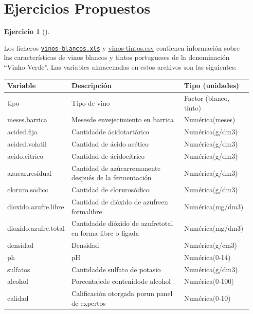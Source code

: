 \documentclass[
  a4paper,
]{scrreport}
\theoremstyle{definition}
\newtheorem{exercise}{Ejercicio}[chapter]
\theoremstyle{remark}
\begin{document}
\section{Ejercicios Propuestos}\label{ejercicios-propuestos-1}

\begin{exercise}[]\protect\hypertarget{exr-preprocesaimento-5}{}\label{exr-preprocesaimento-5}

Los ficheros \href{datos/vinos-blancos.xls}{\texttt{vinos-blancos.xls}}
y \href{datos/vinos-tintos.csv}{vinos-tintos.csv} contienen información
sobre las características de vinos blancos y tintos portugueses de la
denominación ``Vinho Verde''. Las variables almacenadas en estos
archivos son las siguientes:

\begin{longtable}[]{@{}
  >{\raggedright\arraybackslash}p{}
  >{\raggedright\arraybackslash}p{}
  >{\raggedright\arraybackslash}p{}@{}}
\toprule\noalign{}
\begin{minipage}[b]{\linewidth}\raggedright
Variable
\end{minipage} & \begin{minipage}[b]{\linewidth}\raggedright
Descripción
\end{minipage} & \begin{minipage}[b]{\linewidth}\raggedright
Tipo (unidades)
\end{minipage} \\
\midrule\noalign{}
\endhead
\bottomrule\noalign{}
\endlastfoot
tipo & Tipo de vino & Factor (blanco, tinto) \\
meses.barrica & Mesesde envejecimiento en barrica & Numérica(meses) \\
acided.fija & Cantidadde ácidotartárico & Numérica(g/dm3) \\
acided.volatil & Cantidad de ácido acético & Numérica(g/dm3) \\
acido.citrico & Cantidad de ácidocítrico & Numérica(g/dm3) \\
azucar.residual & Cantidad de azúcarremanente después de la fermentación
& Numérica(g/dm3) \\
cloruro.sodico & Cantidad de clorurosódico & Numérica(g/dm3) \\
dioxido.azufre.libre & Cantidad de dióxido de azufreen formalibre &
Numérica(mg/dm3) \\
dioxido.azufre.total & Cantidadde dióxido de azufretotal en forma libre
o ligada & Numérica(mg/dm3) \\
densidad & Densidad & Numérica(g/cm3) \\
ph & pH & Numérica(0-14) \\
sulfatos & Cantidadde sulfato de potasio & Numérica(g/dm3) \\
alcohol & Porcentajede contenidode alcohol & Numérica(0-100) \\
calidad & Calificación otorgada porun panel de expertos &
Numérica(0-10) \\
\end{longtable}


\end{exercise}
\end{document}
